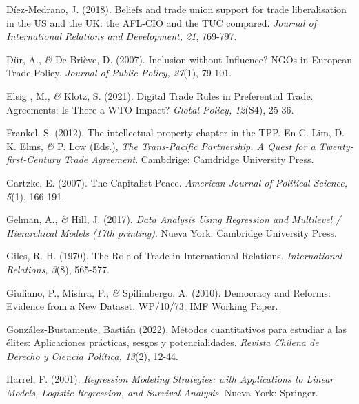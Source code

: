 \documentclass[a4paper]{tufte-handout}
\begin{document}
\begin{list}{}
\item{\small Díez-Medrano, J. (2018). Beliefs and trade union support for trade liberalisation in the US and the UK: the AFL-CIO and the TUC compared. {\itshape Journal of International Relations and Development, 21}, 769-797.}

\item{\small Dür, A., {\itshape \&} De Briève, D. (2007). Inclusion without Influence? NGOs in European Trade Policy. {\itshape Journal of Public Policy, 27}(1), 79-101.}

\item{\small Elsig , M., {\itshape \&} Klotz, S. (2021). Digital Trade Rules in Preferential Trade. Agreements: Is There a WTO Impact? {\itshape Global Policy, 12}(S4), 25-36.}

\item{\small Frankel, S. (2012). The intellectual property chapter in the TPP. En C. Lim, D. K. Elms, {\itshape \&} P. Low (Eds.), {\itshape The Trans-Pacific Partnership. A Quest for a Twenty-first-Century Trade Agreement}. Cambdrige: Camdridge University Press.}

\item{\small Gartzke, E. (2007). The Capitalist Peace. {\itshape American Journal of Political Science, 5}(1), 166-191.}

\item{\small Gelman, A., {\itshape \&} Hill, J. (2017). {\itshape Data Analysis Using Regression and Multilevel / Hierarchical Models (17th printing)}. Nueva York: Cambridge University Press.}

\item{\small Giles, R. H. (1970). The Role of Trade in International Relations. {\itshape International Relations, 3}(8), 565-577.}

\item{\small Giuliano, P., Mishra, P., {\itshape \&} Spilimbergo, A. (2010). Democracy and Reforms: Evidence from a New Dataset. WP/10/73. IMF Working Paper.}

\item{\small González-Bustamente, Bastián (2022), Métodos cuantitativos para estudiar a las élites: Aplicaciones prácticas, sesgos y potencialidades. {\itshape Revista Chilena de Derecho y Ciencia Política, 13}(2), 12-44. }

\item{\small Harrel, F. (2001). {\itshape Regression Modeling Strategies: with Applications to Linear Models, Logistic Regression, and Survival Analysis}. Nueva York: Springer.}


\end{list}
\end{document}
